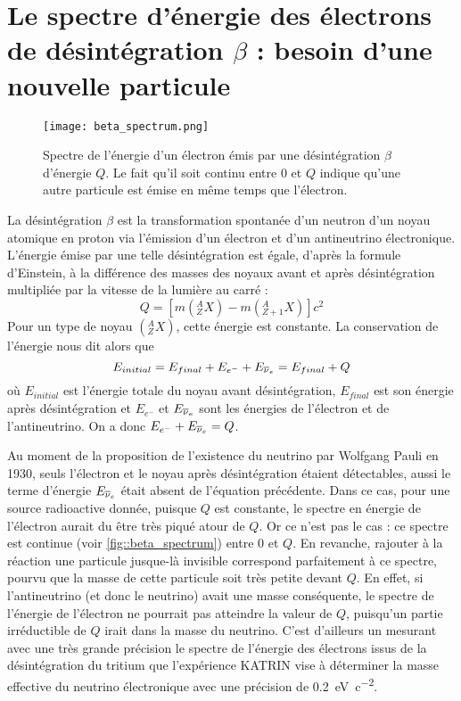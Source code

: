    \section{Le spectre d'énergie des électrons de désintégration \texorpdfstring{$\beta$}{b} : besoin d'une nouvelle particule}\label{sec::neutrino_origin}

      \begin{figure}[htpb]
        \centering
        \texttt{[image: beta\_spectrum.png]}
        \caption[Spectre de désintégration $\beta$]{\label{fig::beta_spectrum}Spectre de l'énergie d'un électron émis par une désintégration $\beta$ d'énergie $Q$. Le fait qu'il soit continu entre 0 et $Q$ indique qu'une autre particule est émise en même temps que l'électron.}
      \end{figure}
      La désintégration $\beta$ est la transformation spontanée d'un neutron d'un noyau atomique en proton via l'émission d'un électron et d'un antineutrino électronique. L'énergie émise par une telle désintégration est égale, d'après la formule d'Einstein, à la différence des masses des noyaux avant et après désintégration multipliée par la vitesse de la lumière au carré : 
      \begin{equation}
	    Q = \left[m\left(^A_Z X\right)-m\left(^A_{Z+1} X\right)\right]c^2
      \end{equation}
      Pour un type de noyau $\left(^A_Z X\right)$, cette énergie est constante. La conservation de l'énergie nous dit alors que
      \begin{equation}
	    E_{initial} = E_{final} +E_{e^-}+E_{\overline{\nu}_e} = E_{final}+Q
      \end{equation}
      où $E_{initial}$ est l'énergie totale du noyau avant désintégration, $E_{final}$ est son énergie après désintégration et $E_{e^-}$ et $E_{\overline{\nu}_e}$ sont les énergies de l'électron et de l'antineutrino. On a donc $E_{e^-}+E_{\overline{\nu}_e} = Q$.

      Au moment de la proposition de l'existence du neutrino par Wolfgang Pauli en 1930\cite{Pauli1930}, seuls l'électron et le noyau après désintégration étaient détectables, aussi le terme d'énergie $E_{\overline{\nu}_e}$ était absent de l'équation précédente. Dans ce cas, pour une source radioactive donnée, puisque $Q$ est constante, le spectre en énergie de l'électron aurait du être très piqué atour de $Q$. Or ce n'est pas le cas : ce spectre est continue (voir \autoref{fig::beta_spectrum}) entre 0 et $Q$. En revanche, rajouter à la réaction une particule jusque-là invisible correspond parfaitement à ce spectre, pourvu que la masse de cette particule soit très petite devant $Q$. En effet, si l'antineutrino (et donc le neutrino) avait une masse conséquente, le spectre de l'énergie de l'électron ne pourrait pas atteindre la valeur de $Q$, puisqu'un partie irréductible de $Q$ irait dans la masse du neutrino. C'est d'ailleurs un mesurant avec une très grande précision le spectre de l'énergie des électrons issus de la désintégration du tritium que l'expérience KATRIN\cite{Kleesiek2018} vise à déterminer la masse effective du neutrino électronique avec une précision de \SI{0.2}{\electronvolt\per c\squared}.

